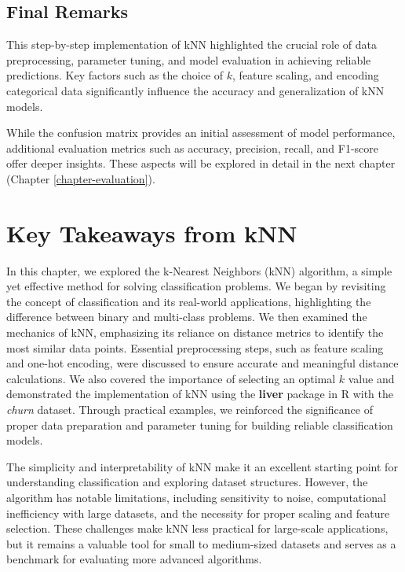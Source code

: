 \documentclass[
  11pt,
]{book}
\theoremstyle{definition}
\theoremstyle{definition}
\theoremstyle{definition}
\theoremstyle{definition}
\theoremstyle{remark}
\begin{document}
\subsection*{Final Remarks}\label{final-remarks}


This step-by-step implementation of kNN highlighted the crucial role of data preprocessing, parameter tuning, and model evaluation in achieving reliable predictions. Key factors such as the choice of \(k\), feature scaling, and encoding categorical data significantly influence the accuracy and generalization of kNN models.

While the confusion matrix provides an initial assessment of model performance, additional evaluation metrics such as accuracy, precision, recall, and F1-score offer deeper insights. These aspects will be explored in detail in the next chapter (Chapter \ref{chapter-evaluation}).

\section{Key Takeaways from kNN}\label{key-takeaways-from-knn}

In this chapter, we explored the k-Nearest Neighbors (kNN) algorithm, a simple yet effective method for solving classification problems. We began by revisiting the concept of classification and its real-world applications, highlighting the difference between binary and multi-class problems. We then examined the mechanics of kNN, emphasizing its reliance on distance metrics to identify the most similar data points. Essential preprocessing steps, such as feature scaling and one-hot encoding, were discussed to ensure accurate and meaningful distance calculations. We also covered the importance of selecting an optimal \(k\) value and demonstrated the implementation of kNN using the \textbf{liver} package in R with the \emph{churn} dataset. Through practical examples, we reinforced the significance of proper data preparation and parameter tuning for building reliable classification models.

The simplicity and interpretability of kNN make it an excellent starting point for understanding classification and exploring dataset structures. However, the algorithm has notable limitations, including sensitivity to noise, computational inefficiency with large datasets, and the necessity for proper scaling and feature selection. These challenges make kNN less practical for large-scale applications, but it remains a valuable tool for small to medium-sized datasets and serves as a benchmark for evaluating more advanced algorithms.
\end{document}
